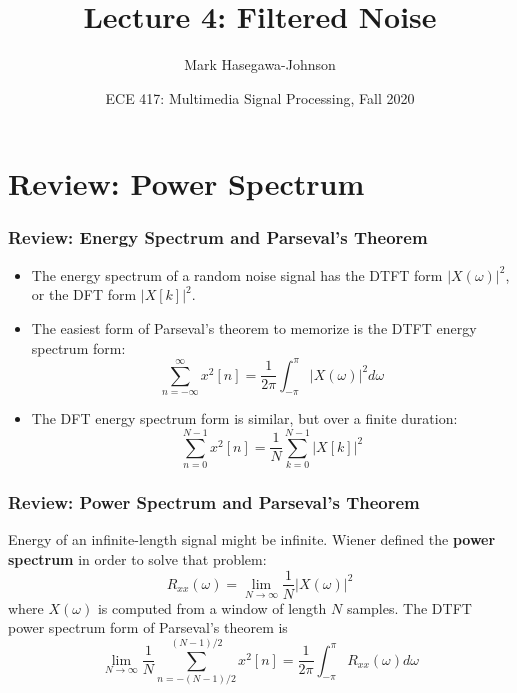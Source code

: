 \documentclass{beamer}
\title{Lecture 4: Filtered Noise}
\author{Mark Hasegawa-Johnson}
\date{ECE 417: Multimedia Signal Processing, Fall 2020}
\begin{document}
\begin{frame}
  \maketitle
\end{frame}

\begin{frame}
  \tableofcontents
\end{frame}

\section[Review]{Review: Power Spectrum}
\setcounter{subsection}{1}

\begin{frame}
  \frametitle{Review: Energy Spectrum and Parseval's Theorem}
  \begin{itemize}
  \item The energy spectrum of a random noise signal has the DTFT form
    $|X(\omega)|^2$, or the DFT form $|X[k]|^2$.
  \item The easiest form of Parseval's theorem to memorize is the DTFT
    energy spectrum form:
    \[
    \sum_{n=-\infty}^\infty x^2[n] = \frac{1}{2\pi}\int_{-\pi}^\pi |X(\omega)|^2d\omega
    \]
  \item The DFT energy spectrum form is similar, but over a finite duration:
    \[
    \sum_{n=0}^{N-1}x^2[n] = \frac{1}{N}\sum_{k=0}^{N-1}|X[k]|^2
    \]
  \end{itemize}
\end{frame}

\begin{frame}
  \frametitle{Review: Power Spectrum and Parseval's Theorem}
  Energy of an infinite-length signal might be infinite.  Wiener
  defined the {\bf power spectrum} in order to solve that problem:
  \[
  R_{xx}(\omega) = \lim_{N\rightarrow\infty} \frac{1}{N}|X(\omega)|^2
  \]
  where $X(\omega)$ is computed from a window of length $N$ samples.
  The DTFT power spectrum form of Parseval's theorem is
  \[
  \lim_{N\rightarrow\infty} \frac{1}{N}\sum_{n=-(N-1)/2}^{(N-1)/2}x^2[n] =
  \frac{1}{2\pi}\int_{-\pi}^\pi R_{xx}(\omega)d\omega
  \]
\end{frame}  
\end{document}
